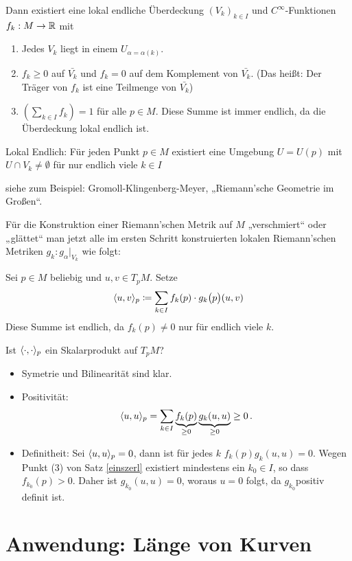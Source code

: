 \documentclass[a4paper,twoside,DIV15,BCOR12mm]{scrbook}
\begin{document}
\begin{beweis}
\begin{satz}
Dann existiert eine lokal endliche  Überdeckung $(V_k)_{k\in I}$ und $C^\infty$-Funktionen $f_k: M \to \mathbb{R}$ mit
\begin{enumerate}
\item Jedes $V_k$ liegt in einem $U_{\alpha=\alpha(k)}$.
\item $f_k\ge 0$ auf $\bar{V_k}$ und $f_k = 0$ auf dem Komplement von $\bar{V_k}$. (Das heißt: Der Träger von $f_k$ ist eine Teilmenge von $\bar{V_k}$)
\item $( \sum_{k\in I} f_k ) = 1$ für alle $p\in M$. Diese Summe ist immer endlich, da die Überdeckung lokal endlich ist. 
\end{enumerate}
\end{satz}
Lokal Endlich: {Für jeden Punkt $p\in M$ existiert eine Umgebung $U=U(p)$ mit $U\cap V_k \ne \emptyset$ für nur endlich viele $k\in I$}
\begin{beweis}
siehe zum Beispiel: Gromoll-Klingenberg-Meyer, „Riemann’sche Geometrie im Großen“.
\end{beweis}

Für die Konstruktion einer Riemann’schen Metrik auf $M$ „verschmiert“ oder „glättet“ man jetzt alle im ersten Schritt konstruierten lokalen Riemann’schen Metriken $g_k : g_\alpha|_{V_k}$ wie folgt: 

Sei $p\in M$ beliebig und $u,v \in T_pM$. Setze 
\[
\ksp uv_p \da \sum_{k\in I} f_k(p) \cdot g_k\big(p\big) (u,v)
\]
Diese Summe ist endlich, da $f_k(p) \ne 0$ nur für endlich viele $k$.

Ist $\langle\cdot,\cdot\rangle_p$ ein Skalarprodukt auf $T_pM$? 
\begin{itemize}
\item Symetrie und Bilinearität sind klar.
\item Positivität:
\[ \langle u,u\rangle_p = \sum_{k\in I} \underbrace{f_k(p)}_{\ge 0} \underbrace{g_k(u,u)}_{\ge 0} \ge 0\,.\]
\item Definitheit: Sei $\langle u,u\rangle_p = 0$, dann ist für jedes $k$ $f_k(p) g_k(u,u) = 0$. Wegen Punkt (3) von Satz \ref{einszerl} existiert mindestens ein $k_0\in I$, so dass $f_{k_0}(p) > 0$. Daher ist $g_{k_0}(u,u) = 0$, woraus $u=0$ folgt, da $g_{k_0} $positiv definit ist.
\end{itemize}

\end{beweis}


\section[Erste Anwendung von Riemann’schen Metriken: Länge von Kurven]{Anwendung: Länge von Kurven}
\end{document}
